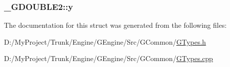 \subsubsection[{y}]{ \+\_\+\+G\+D\+O\+U\+B\+L\+E2\+::y}\label{struct___g_d_o_u_b_l_e2_a31ea118973d237692042c8ef6434eba0}


The documentation for this struct was generated from the following files\+:\begin{DoxyCompactItemize}
\item 
D\+:/\+My\+Project/\+Trunk/\+Engine/\+G\+Engine/\+Src/\+G\+Common/\hyperlink{_g_types_8h}{G\+Types.\+h}\item 
D\+:/\+My\+Project/\+Trunk/\+Engine/\+G\+Engine/\+Src/\+G\+Common/\hyperlink{_g_types_8cpp}{G\+Types.\+cpp}\end{DoxyCompactItemize}
